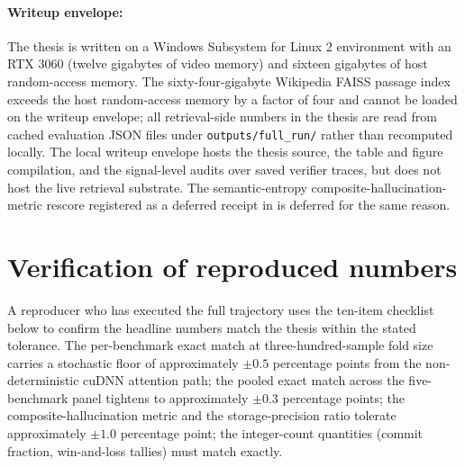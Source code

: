 \paragraph{Writeup envelope:} The thesis is written on a Windows Subsystem for Linux 2 environment with an RTX 3060 (twelve gigabytes of video memory) and sixteen gigabytes of host random-access memory. The sixty-four-gigabyte Wikipedia FAISS passage index exceeds the host random-access memory by a factor of four and cannot be loaded on the writeup envelope; all retrieval-side numbers in the thesis are read from cached evaluation JSON files under \verb|outputs/full_run/| rather than recomputed locally. The local writeup envelope hosts the thesis source, the table and figure compilation, and the signal-level audits over saved verifier traces, but does not host the live retrieval substrate. The semantic-entropy composite-hallucination-metric rescore registered as a deferred receipt in  is deferred for the same reason.

\section{Verification of reproduced numbers}
\label{app:repro-verify}

A reproducer who has executed the full trajectory uses the ten-item checklist below to confirm the headline numbers match the thesis within the stated tolerance. The per-benchmark exact match at three-hundred-sample fold size carries a stochastic floor of approximately $\pm 0.5$ percentage points from the non-deterministic cuDNN attention path; the pooled exact match across the five-benchmark panel tightens to approximately $\pm 0.3$ percentage points; the composite-hallucination metric and the storage-precision ratio tolerate approximately $\pm 1.0$ percentage point; the integer-count quantities (commit fraction, win-and-loss tallies) must match exactly.

